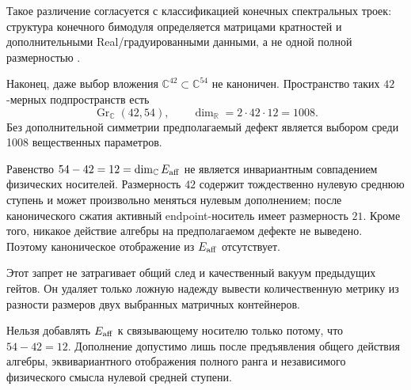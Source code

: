 Такое различение согласуется с классификацией конечных спектральных троек:
структура конечного бимодуля определяется матрицами кратностей и
дополнительными Real/градуированными данными, а не одной полной
размерностью \cite{v7-affine-defect-krajewski,v7-affine-defect-cacic}.

Наконец, даже выбор вложения $\mathbb C^{42}\subset\mathbb C^{54}$ не
каноничен. Пространство таких $42$-мерных подпространств есть
\begin{equation}
 \operatorname{Gr}_{\mathbb C}(42,54),
 \qquad
 \dim_{\mathbb R}=2\cdot42\cdot12=1008.
 \label{eq:v7-affine-defect-grassmannian}
\end{equation}
Без дополнительной симметрии предполагаемый дефект является выбором среди
1008 вещественных параметров.

\begin{theorem}
Равенство $54-42=12=\dim_{\mathbb C}E_{\rm aff}$ не является инвариантным
совпадением физических носителей. Размерность $42$ содержит тождественно
нулевую среднюю ступень и может произвольно меняться нулевым дополнением;
после канонического сжатия активный endpoint-носитель имеет размерность
$21$. Кроме того, никакое действие алгебры на предполагаемом дефекте не
выведено. Поэтому каноническое отображение из $E_{\rm aff}$ отсутствует.
\end{theorem}

\begin{remark}
Этот запрет не затрагивает общий след и качественный вакуум предыдущих
гейтов. Он удаляет только ложную надежду вывести количественную метрику из
разности размеров двух выбранных матричных контейнеров.
\end{remark}

\begin{nogocriterion}
Нельзя добавлять $E_{\rm aff}$ к связывающему носителю только потому, что
$54-42=12$. Дополнение допустимо лишь после предъявления общего действия
алгебры, эквивариантного отображения полного ранга и независимого
физического смысла нулевой средней ступени.
\end{nogocriterion}

